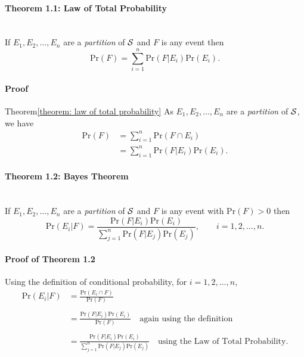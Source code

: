 \paragraph{Theorem 1.1: Law of Total Probability}{\label{theorem: law of total probability} ~\\
If $E_1,E_2,\ldots,E_n$ are a {\it partition} of ${\cal S}$ and $F$ is
any event then
$$
\text{Pr}(F)=\sum_{i=1}^n \text{Pr}(F|E_i)\text{Pr}(E_i).
$$}
\paragraph{Proof}{Theorem}{\ref{theorem: law of total probability}}
As $E_1,E_2,\ldots,E_n$ are a {\it partition} of ${\cal S}$, we have
\begin{align*}
\text{Pr}(F)&=\sum_{i=1}^n \text{Pr}(F\cap E_i) \\
&=\sum_{i=1}^n \text{Pr}(F|E_i)\text{Pr}(E_i).
\end{align*}
\paragraph{Theorem 1.2: Bayes Theorem}{\label{theorem: bayes} ~\\
If $E_1,E_2,\ldots,E_n$ are a {\it partition} of ${\cal S}$ and $F$ is
any event with $\text{Pr}(F)>0$ then
$$\text{Pr}(E_i|F)=\frac{\text{Pr}(F|E_i)\text{Pr}(E_i)}{\sum_{j=1}^n \text{Pr}(F|E_j)\text{Pr}(E_j)},
\quad\quad i=1,2,\ldots,n. $$}

\paragraph{Proof of Theorem 1.2}{


{
Using the definition of conditional probability, for $i=1,2,\ldots,n$,
\begin{align*}
\text{Pr}(E_i|F)&=\frac{\text{Pr}(E_i\cap F)}{\text{Pr}(F)} \\
                & \\
&=\frac{\text{Pr}(F|E_i)\text{Pr}(E_i)}{\text{Pr}(F)} \quad\text{again using the
definition}\\ 
            & \\
&=\frac{\text{Pr}(F|E_i)\text{Pr}(E_i)}{\sum_{j=1}^n \text{Pr}(F|E_j)\text{Pr}(E_j)}
\quad\text{using the Law of Total Probability}.
\end{align*}
}

}


\newpage

